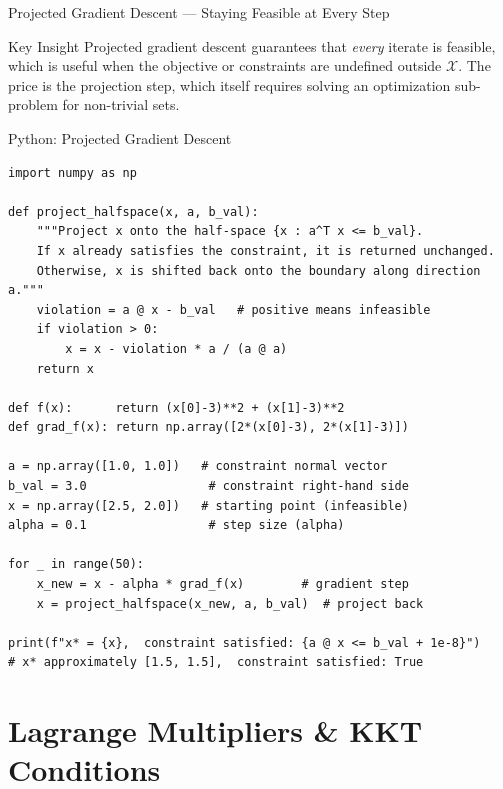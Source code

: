 \documentclass[aspectratio=169,10pt]{beamer}
\begin{document}
\begin{frame}[allowframebreaks]{Projected Gradient Descent --- Staying Feasible at Every Step}
  \begin{alertblock}{Key Insight}
    Projected gradient descent guarantees that \emph{every} iterate is
    feasible, which is useful when the objective or constraints are undefined
    outside $\mathcal{X}$.  The price is the projection step, which itself
    requires solving an optimization sub-problem for non-trivial sets.
  \end{alertblock}

\end{frame}

\begin{frame}[fragile]{Python: Projected Gradient Descent}
  \begin{lstlisting}[style=pycode,caption={Projected gradient descent onto the half-space $x_1 + x_2 \le 3$}]
import numpy as np

def project_halfspace(x, a, b_val):
    """Project x onto the half-space {x : a^T x <= b_val}.
    If x already satisfies the constraint, it is returned unchanged.
    Otherwise, x is shifted back onto the boundary along direction a."""
    violation = a @ x - b_val   # positive means infeasible
    if violation > 0:
        x = x - violation * a / (a @ a)
    return x

def f(x):      return (x[0]-3)**2 + (x[1]-3)**2
def grad_f(x): return np.array([2*(x[0]-3), 2*(x[1]-3)])

a = np.array([1.0, 1.0])   # constraint normal vector
b_val = 3.0                 # constraint right-hand side
x = np.array([2.5, 2.0])   # starting point (infeasible)
alpha = 0.1                 # step size (alpha)

for _ in range(50):
    x_new = x - alpha * grad_f(x)        # gradient step
    x = project_halfspace(x_new, a, b_val)  # project back

print(f"x* = {x},  constraint satisfied: {a @ x <= b_val + 1e-8}")
# x* approximately [1.5, 1.5],  constraint satisfied: True
  \end{lstlisting}
\end{frame}

\section{Lagrange Multipliers \& KKT Conditions}
\end{document}
